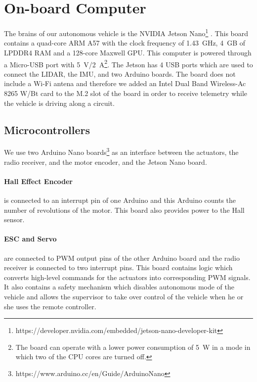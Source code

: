 \section{On-board Computer}

The brains of our autonomous vehicle is the NVIDIA Jetson Nano\footnote{https://developer.nvidia.com/embedded/jetson-nano-developer-kit} . This board contains a quad-core ARM A57 with the clock frequency of \SI{1.43}{\giga\hertz}, \SI{4}{\giga B} of LPDDR4 RAM and a 128-core Maxwell GPU. This computer is powered through a Micro-USB port with \SI{5}{\volt}/\SI{2}{\ampere}\footnote{The board can operate with a lower power consumption of \SI{5}{\watt} in a mode in which two of the CPU cores are turned off.}. The Jetson has 4 USB ports which are used to connect the \gls*{LIDAR}, the \gls*{IMU}, and two Arduino boards. The board does not include a Wi-Fi antena and therefore we added an Intel Dual Band Wireless-Ac 8265 W/Bt card to the M.2 slot of the board in order to receive telemetry while the vehicle is driving along a circuit.

\subsection{Microcontrollers}

We use two Arduino Nano boards\footnote{https://www.arduino.cc/en/Guide/ArduinoNano} as an interface between the actuators, the radio receiver, and the motor encoder, and the Jetson Nano board.

\paragraph{Hall Effect Encoder} is connected to an interrupt pin of one Arduino and this Arduino counts the number of revolutions of the motor. This board also provides power to the Hall sensor.

\paragraph{ESC and Servo} are connected to \gls{PWM} output pins of the other Arduino board and the radio receiver is connected to two interrupt pins. This board contains logic which converts high-level commands for the actuators into corresponding \gls*{PWM} signals. It also contains a safety mechanism which disables autonomous mode of the vehicle and allows the supervisor to take over control of the vehicle when he or she uses the remote controller.

